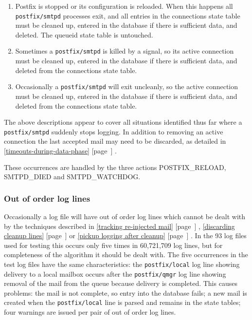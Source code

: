 \documentclass[a4paper,12pt,draft]{article}
\newcommand{\refwithpage}[1]{%
    \empty{}\ref{#1} [page~\pageref{#1}]%
}
\newcommand{\sectionref}[1]{%
    \textsection{}\refwithpage{#1}%
}
\newcommand{\daemon}[1]{%
    \texttt{postfix/#1}%
}
\newcommand{\numberOFlogFILES}[0]{%
    93%
}
\begin{document}
\begin{enumerate}

    \item Postfix is stopped or its configuration is reloaded.  When this
        happens all \daemon{smtpd} processes exit, and all entries in the
        connections state table must be cleaned up, entered in the database
        if there is sufficient data, and deleted.  The queueid state table
        is untouched.

    \item Sometimes a \daemon{smtpd} is killed by a signal, so its active
        connection must be cleaned up, entered in the database if there is
        sufficient data, and deleted from the connections state table.

    \item Occasionally a \daemon{smtpd} will exit uncleanly, so the active
        connection must be cleaned up, entered in the database if there is
        sufficient data, and deleted from the connections state table.

\end{enumerate}

The above descriptions appear to cover all situations identified thus far
where a \daemon{smtpd} suddenly stops logging.  In addition to removing an
active connection the last accepted mail may need to be discarded, as
detailed in \sectionref{timeouts-during-data-phase}.

These occurrences are handled by the three actions POSTFIX\_RELOAD,
SMTPD\_DIED and SMTPD\_WATCHDOG\@.

\subsubsection{Out of order log lines}

\label{out of order log lines}

Occasionally a log file will have out of order log lines which cannot be
dealt with by the techniques described in \sectionref{tracking re-injected
mail}, \sectionref{discarding cleanup lines} or \sectionref{pickup logging
after cleanup}.  In the \numberOFlogFILES{} log files used for testing this
occurs only five times in 60,721,709 log lines, but for completeness of the
algorithm it should be dealt with.  The five occurrences in the test log
files have the same characteristics: the \daemon{local} log line showing
delivery to a local mailbox occurs after the \daemon{qmgr} log line showing
removal of the mail from the queue because delivery is completed.  This
causes problems: the mail is not complete, so entry into the database
fails; a new mail is created when the \daemon{local} line is parsed and
remains in the state tables; four warnings are issued per pair of out of
order log lines.
\end{document}
